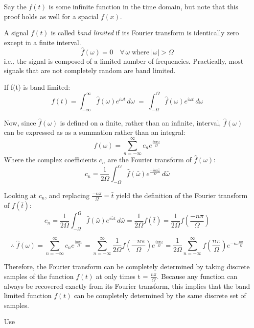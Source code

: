 \documentclass[12pt]{article}
\newcommand{\inftyint}{\int_{-\infty}^{\infty}}
\begin{document}
Say the \(f(t)\) is some infinite function in the time domain, but note that this proof holds as well for a spacial \(f(x)\).

A signal \(f(t)\) is called \emph{band limited} if its Fourier transform is identically zero except in a finite interval.
\[\hat{f}(\omega) = 0 \quad \forall \, \omega \; \text{where} \; |\omega| > \Omega\]
i.e., the signal is composed of a limited number of frequencies. Practically, most signals that are not completely random are band limited.

If f(t) is band limited:
\[f(t) = \inftyint \hat{f}(\omega)e^{i\omega t} \,d\omega \; = \; \int_{-\Omega}^{\Omega} \hat{f}(\omega)e^{i\omega t} \,d\omega\]

Now, since \( \hat{f}(\omega) \) is defined on a finite, rather than an infinite, interval, \( \hat{f}(\omega) \) can be expressed as as a summation rather than an integral:
\[\hat{f}(\omega) = \sum_{n = -\infty}^{\infty} c_{n}e^{\frac{i n \pi \omega}{\Omega}} \]
Where the complex coefficients \( c_n\) are the Fourier transform of \( \hat{f}(\omega) \):
\[ c_n = \frac{1}{2\Omega} \int_{-\Omega}^{\Omega} \hat{f}(\bar{\omega})e^{\frac{-i n \pi \bar{ \omega}}{\Omega}}\,d\bar{\omega}\]

Looking at \(c_n\), and replacing \( \frac{-n\pi}{\Omega} = \bar{t}\) yield the definition of the Fourier transform of \( f(\bar{t})\):
\[ c_n = \frac{1}{2\Omega} \int_{-\Omega}^{\Omega} \hat{f}(\bar{\omega})e^{i\bar{\omega}\bar{t}}\,d\bar{\omega} = \frac{1}{2\Omega} f(\bar{t}) = \frac{1}{2\Omega} f(\frac{-n\pi}{\Omega})\]

\begin{equation}
\label{eq:nfhat}
\therefore \; \hat{f}(\omega) = \sum_{n = -\infty}^{\infty} c_{n}e^{\frac{i n \pi \omega}{\Omega}} = \sum_{n = -\infty}^{\infty} \frac{1}{2\Omega} f(\frac{-n\pi}{\Omega})e^{\frac{i n \pi \omega}{\Omega}} = \frac{1}{2\Omega} \sum_{n = -\infty}^{\infty} f(\frac{n\pi}{\Omega})e^{-i \omega \frac{n \pi}{\Omega} } 
\end{equation}

Therefore, the Fourier transform can be completely determined by taking discrete samples of the function \( f(t) \) at only times t = \( \frac{n\pi}{\Omega}\). Because any function can always be recovered exactly from its Fourier transform, this implies that the band limited function \( f(t) \) can be completely determined by the same discrete set of samples.

Use 
\end{document}
